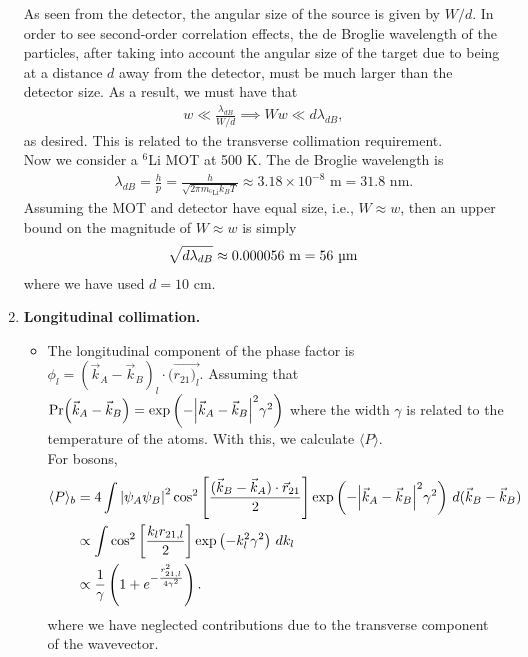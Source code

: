 \documentclass{article}
\theoremstyle{definition}
\newcommand{\f}[2]{\frac{#1}{#2}}
\newcommand{\lp}{\left(}
\newcommand{\rp}{\right)}
\newcommand{\lb}{\left[}
\newcommand{\rb}{\right]}
\begin{document}
\begin{enumerate}[label=(\alph*)]
\noindent  As seen from the detector, the angular size of the source is given by $W/d$. In order to see second-order correlation effects, the de Broglie wavelength of the particles, after taking into account the angular size of the target due to being at a distance $d$ away from the detector, must be much larger than the detector size.  As a result, we must have that 
\begin{align*}
w \ll \f{\lambda_{dB}}{W/d} \implies Ww \ll d \lambda_{dB},
\end{align*}
as desired. This is related to the transverse collimation requirement. \\


\noindent Now we consider a $^6$Li MOT at 500 \textmu K. The de Broglie wavelength is 
\begin{align*}
\lambda_{dB} = \f{h}{p} = \f{h}{\sqrt{2\pi m_{^6\text{Li}} k_BT}} \approx 3.18 \times 10^{-8} \text{ m} = 31.8 \text{ nm}. 
\end{align*}
Assuming the MOT and detector have equal size, i.e., $W \approx w$, then an upper bound on the magnitude of $W\approx w$ is simply 
\begin{align*}
\sqrt{d\lambda_{dB}} \approx 0.000056 \text{ m} = 56 \text{ \textmu m}
\end{align*}
where we have used $d=10$ cm. 




\item \textbf{Longitudinal collimation.}

\begin{itemize}
\item The longitudinal component of the phase factor is $\phi_l = (\vec{k}_A - \vec{k}_B)_l \cdot (\vec{r_{21})_l}$. Assuming that $\Pr (\vec{k}_A - \vec{k}_B) = \exp\lp -\abs{ \vec{k}_A - \vec{k}_B }^2 \gamma^2  \rp $ where the width $\gamma$ is related to the temperature of the atoms. With this, we calculate $\langle P \rangle$. \\

\noindent For bosons,
\begin{align*}
\langle P \rangle_b
&= 4\int \abs{\psi_A \psi_B}^2 
\cos^2 \lb \f{(\vec{k}_B - \vec{k}_A )\cdot \vec{r}_{21}}{2}  \rb
\exp\lp -\abs{ \vec{k}_A - \vec{k}_B }^2 \gamma^2  \rp \, d (\vec{k}_B - \vec{k}_B) \\ 
&\propto \int \cos^2\lb \f{k_l r_{21,l}}{2} \rb \exp\lp -k_l^2 \gamma^2 \rp\,d k_l \\
&\propto \f{1}{\gamma}\lp 1 +  e^{- \f{r_{21,l}^2 }{ 4\gamma^2}} \rp.
\end{align*}
where we have neglected contributions due to the transverse component of the wavevector.\\


\end{itemize}
\end{enumerate}
\end{document}

